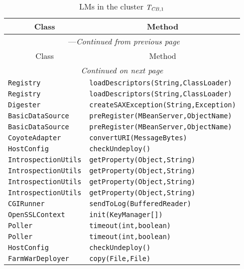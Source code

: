\begin{center}
\begin{longtable}{ll}
\caption{LMs in the cluster $\mathit{T}_{\mathit{CB},1}$}\\
\toprule\multicolumn{1}{c}{Class}&\multicolumn{1}{c}{Method}\\\midrule
\endfirsthead

\multicolumn{2}{c}{\tablename\ \thetable{}---\textit{Continued from previous page}} \\\midrule
\multicolumn{1}{c}{Class}&\multicolumn{1}{c}{Method}\\\midrule
\endhead
\multicolumn{2}{c}{\textit{Continued on next page}}\\\midrule
\endfoot
\bottomrule
\endlastfoot

\lstinline/Registry/&{\lstinline/loadDescriptors(String,ClassLoader)/}\\
\lstinline/Registry/&{\lstinline/loadDescriptors(String,ClassLoader)/}\\
\lstinline/Digester/&{\lstinline/createSAXException(String,Exception)/}\\
\lstinline/BasicDataSource/&{\lstinline/preRegister(MBeanServer,ObjectName)/}\\
\lstinline/BasicDataSource/&{\lstinline/preRegister(MBeanServer,ObjectName)/}\\
\lstinline/CoyoteAdapter/&{\lstinline/convertURI(MessageBytes)/}\\
\lstinline/HostConfig/&{\lstinline/checkUndeploy()/}\\
\lstinline/IntrospectionUtils/&{\lstinline/getProperty(Object,String)/}\\
\lstinline/IntrospectionUtils/&{\lstinline/getProperty(Object,String)/}\\
\lstinline/IntrospectionUtils/&{\lstinline/getProperty(Object,String)/}\\
\lstinline/IntrospectionUtils/&{\lstinline/getProperty(Object,String)/}\\
\lstinline/CGIRunner/&{\lstinline/sendToLog(BufferedReader)/}\\
\lstinline/OpenSSLContext/&{\lstinline/init(KeyManager[])/}\\
\lstinline/Poller/&{\lstinline/timeout(int,boolean)/}\\
\lstinline/Poller/&{\lstinline/timeout(int,boolean)/}\\
\lstinline/HostConfig/&{\lstinline/checkUndeploy()/}\\
\lstinline/FarmWarDeployer/&{\lstinline/copy(File,File)/}\\

\end{longtable}
\end{center}
